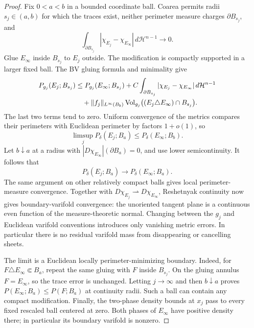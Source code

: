 \begin{proof}
Fix $0<a<b$ in a bounded coordinate ball. Coarea permits radii
$s_j\in(a,b)$ for which the traces exist, neither perimeter
measure charges $\partial B_{s_j}$, and
\[
 \int_{\partial B_{s_j}}
          |\chi_{E_j}-\chi_{E_\infty}|\,
                d\mathcal H^{n-1}\longrightarrow0.
\]
Glue $E_\infty$ inside $B_{s_j}$ to $E_j$ outside. The
modification is compactly supported in a larger fixed ball.
The BV gluing formula and minimality give
\begin{align*}
 P_{g_j}(E_j;B_{s_j})
 &\le P_{g_j}(E_\infty;B_{s_j})
       +C\int_{\partial B_{s_j}}
            |\chi_{E_j}-\chi_{E_\infty}|\,
                           d\mathcal H^{n-1}\\
 &\quad+\|f_j\|_{L^\infty(B_b)}
       \operatorname{Vol}_{g_j}\bigl((E_j\triangle E_\infty)
                                      \cap B_{s_j}\bigr).
\end{align*}
The last two terms tend to zero. Uniform convergence of the
metrics compares their perimeters with Euclidean perimeter by
factors $1+o(1)$, so
\[
 \limsup_jP_\delta(E_j;B_a)
             \le P_\delta(E_\infty;B_b).
\]
Let $b\downarrow a$ at a radius with
$|D\chi_{E_\infty}|(\partial B_a)=0$, and use lower
semicontinuity. It follows that
\begin{equation}\label{eq:rpi:bw-strict-bv}
 P_\delta(E_j;B_a)\longrightarrow
                         P_\delta(E_\infty;B_a).
\end{equation}
The same argument on other relatively compact balls gives local
perimeter-measure convergence. Together with
$D\chi_{E_j}\rightharpoonup D\chi_{E_\infty}$,
Reshetnyak continuity now gives boundary-varifold convergence:
the unoriented tangent plane is a continuous even function of
the measure-theoretic normal. Changing between the $g_j$
and Euclidean varifold conventions introduces only vanishing
metric errors. In particular there is no residual varifold mass
from disappearing or cancelling sheets.

The limit is a Euclidean locally perimeter-minimizing boundary.
Indeed, for $F\triangle E_\infty\Subset B_a$, repeat the
same gluing with $F$ inside $B_{s_j}$. On the gluing annulus
$F=E_\infty$, so the trace error is unchanged. Letting
$j\to\infty$ and then $b\downarrow a$ proves
$P(E_\infty;B_a)\le P(F;B_a)$ at continuity radii. Such a
ball can contain any compact modification. Finally, the two-phase
density bounds at $x_j$ pass to every fixed rescaled ball
centered at zero. Both phases of $E_\infty$ have positive
density there; in particular its boundary varifold is nonzero.


\end{proof}
